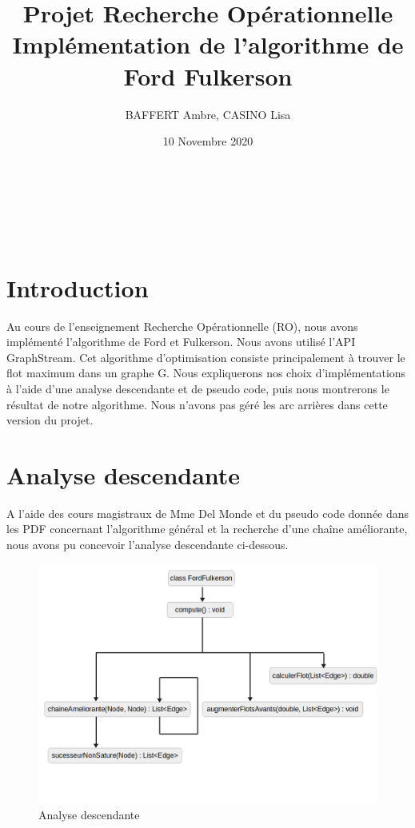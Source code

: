 \documentclass{article}
\title{\textbf{Projet Recherche Opérationnelle\\
Implémentation de l'algorithme de Ford Fulkerson}}
\author{BAFFERT Ambre, CASINO Lisa}
\date{10 Novembre 2020}
\begin{document}
\makeatletter
  \begin{titlepage}
  \centering
    \vspace{1cm}
      \hfill
    \vspace{1cm}
    \vfill
       {\LARGE \textbf{\@title}} \\
    \vspace{2em}
        {\large \@author} \\
    \vspace{3em}
        {\large \@date} \\
    \vfill
  \end{titlepage}
\makeatother

\newpage{}
\section{Introduction}

Au cours de l'enseignement Recherche Opérationnelle (RO), nous avons implémenté l'algorithme de Ford et Fulkerson. Nous avons utilisé l'API  GraphStream. Cet algorithme d'optimisation consiste principalement à trouver le flot maximum dans un graphe G. Nous expliquerons nos choix d'implémentations à l'aide d'une analyse descendante et de pseudo code, puis nous montrerons le résultat de notre algorithme. Nous n'avons pas géré les arc arrières dans cette version du projet.

\section{Analyse descendante}

A l'aide des cours magistraux de Mme Del Monde et du pseudo code donnée dans les PDF concernant l'algorithme général et la recherche d'une chaîne améliorante, nous avons pu concevoir l'analyse descendante ci-dessous.

\begin{figure}[!ht]
    \center
    \includegraphics[width=13cm]{./images/AnalyseDescendante.png}
    \caption{Analyse descendante}
\end{figure}
\end{document}
